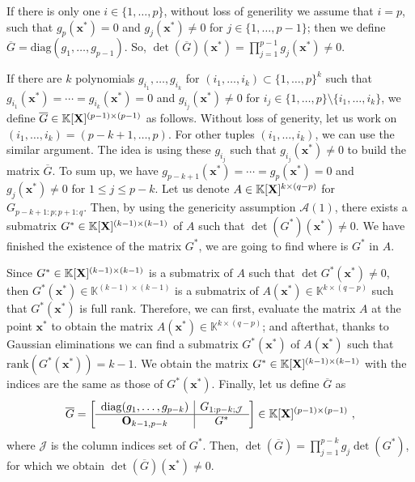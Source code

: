 \documentclass[11pt]{article}
\numberwithin{Property}{section}
\numberwithin{Theorem}{section}
\numberwithin{Proposition}{section}
\numberwithin{Lemma}{section}
\numberwithin{Corollary}{section}
\numberwithin{Definition}{section}
\numberwithin{Remark}{section}
\numberwithin{Conjecture}{section}
\numberwithin{Problem}{section}
\numberwithin{Claim}{section}
\theoremstyle{definition}
\numberwithin{Example}{section}
\renewcommand{\leq}{\leqslant}
\def\bar{\overline}
\newcommand{\field}{\mathbb{K}} %
\newcommand{\mat}[1]{\mathbf{\MakeUppercase{#1}}} %
\begin{document}
If there is only one $i \in \{1, \ldots, p\}$, without loss of generility we assume that $i=p$, such that $g_{p}(\mathbf{x}^*) = 0$ and $g_{j}(\mathbf{x}^*) \ne 0$ for $j \in \{1, \ldots, p-1\}$; then we define $\bar{G} = \mathrm{diag}(g_1, \ldots, g_{p-1})$. So, $\det(\bar{G})(\mathbf{x}^*) = \prod_{j=1}^{p-1}g_j(\mathbf{x}^*) \ne 0$.

If there are $k$ polynomials $g_{i_1}, \ldots, g_{i_k}$ for $(i_1, \ldots, i_k) \subset \{1, \ldots, p\}^k$ such that $g_{i_1}(\mathbf{x}^*) = \cdots = g_{i_k}(\mathbf{x}^*) = 0$ and $g_{i_j}(\mathbf{x}^*) \ne 0$ for $i_j \in \{1, \ldots, p\} \setminus \{i_1, \ldots, i_k\}$, we define $\bar{G} \in \field[\mat{X}]^{(p-1) \times (p-1)}$ as follows. Without loss of generity, let us work on $(i_1, \ldots, i_k) = (p-k+1, \ldots, p)$. For other tuples $(i_1, \ldots, i_k)$, we can use the similar argument. The idea is using these $g_{i_j}$ such that $g_{i_j}(\mathbf{x}^*) \ne 0$ to build the matrix $\bar{G}$. To sum up, we have $g_{p-k+1}(\mathbf{x}^*) = \cdots = g_{p}(\mathbf{x}^*) = 0$ and $g_j(\mathbf{x}^*) \ne 0$ for $1 \leq j \leq p-k$. Let us denote $A \in \field[\mat{X}]^{k \times (q-p)}$ for $G_{p-k+1:p\mathbf{;}p+1:q}$. Then, by using the genericity assumption $\mathcal{A}(1)$, there exists a submatrix ${G}^* \in \field[\mat{X}]^{(k-1) \times (k-1)}$ of $A$ such that $\det({G}^*)(\mathbf{x}^*) \ne 0$. We have finished the existence of the matrix ${G}^*$, we are going to find where is ${G}^*$ in $A$. 

Since ${G}^* \in \field[\mat{X}]^{(k-1) \times (k-1)}$  is a submatrix of $A$ such that $\det{{G}^*}(\mathbf{x}^*) \ne 0$, then ${G}^*(\mathbf{x}^*) \in \field^{(k-1)\times (k-1)}$ is a submatrix of $A(\mathbf{x}^*) \in \field^{k \times (q-p)}$ such that ${G}^*(\mathbf{x}^*)$ is full rank. Therefore, we can first, evaluate the matrix $A$ at the point $\mathbf{x}^*$ to obtain the matrix $A(\mathbf{x}^*) \in \field^{k \times (q-p)}$; and afterthat, thanks to Gaussian eliminations we can find a submatrix ${G}^*(\mathbf{x}^*)$ of $A(\mathbf{x}^*)$ such that $\mathrm{rank}({G}^*(\mathbf{x}^*)) = k-1$.  We obtain the matrix ${G}^* \in \field[\mat{X}]^{(k-1) \times (k-1)}$ with the indices are the same as those of ${G}^*(\mathbf{x}^*)$. Finally, let us define $\bar{G}$ as 
\[\bar{G} = 
\left[\begin{array}{c |c}%
\mathrm{diag}(g_1, \ldots, g_{p-k}) & G_{1:p-k; \mathcal{J}} \\  \hline
\mat{O}_{k-1,p-k} & G^*\\
\end{array}
\right] \in \field[\mat{X}]^{(p-1) \times (p-1)} \ ,\] where $\mathcal{J}$ is the column indices set of $G^*$. Then, $\det(\bar{G}) = \prod_{j = 1}^{p-k}g_j\det(G^*)$, for which we obtain $\det(\bar{G})(\mathbf{x}^*) \ne 0$.
\end{document}
